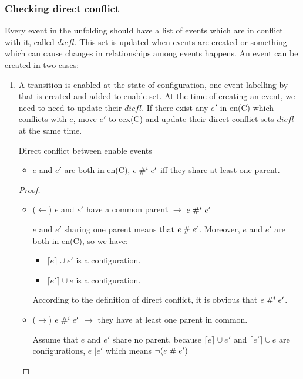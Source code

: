 \documentclass{llncs}
\begin{document}
\subsubsection{Checking direct conflict}
Every event in the unfolding should have a list of events which are in conflict with it, called $dicfl$. This set is updated when events are created or something which can cause changes in relationships among events happens.
An event can be created in two cases:
\begin{enumerate}
	\item
		A transition is enabled at the state of configuration, one event labelling by that is
		created and added to enable set. At the time of creating an event, we need to 
		need to update their $dicfl$. If there exist any $e'$ in en(C) which conflicts with $e$,
		move $e'$ to cex(C) and update their direct conflict sets $dicfl$ at the same time. 		
		
		\begin{lemma}{Direct conflict between enable events}
			\begin{itemize}
				\item
					$e$ and $e'$ are both in en(C), $e \mathrel{\#^i_{}} e'$ iff they share at least one parent.		
			\end{itemize}
		\label{thm:lem1}
		\end{lemma}
		
		\begin{proof}
		\begin{itemize}
			\item
			($\leftarrow$) $e$ and $e'$ have a common parent $\rightarrow$ $e \mathrel{\#^i_{}} e'$
			
			 $e$ and $e'$ sharing one parent means that  $e \mathrel{\#} e'$. Moreover, $e$ and $e'$ are both in
			  en(C), so we have:
			\begin{itemize}
				\item
					$\lceil e \rceil \cup e'$ is a configuration.
				\item
					$\lceil e' \rceil \cup e$ is a configuration.
			\end{itemize} 
			According to the definition of direct conflict, it is obvious that $e \mathrel{\#^i_{}} e'$.
			
			\item
			($\rightarrow$) $e \mathrel{\#^i_{}} e'$ $\rightarrow$ they have at least one parent in common.
			
			Assume that $e$ and $e'$ share no parent, because $\lceil e \rceil \cup e'$ and $\lceil
			e' \rceil \cup e$ are configurations, $e || e'$ which means $\lnot (e \mathrel{\#} e')$
		\end{itemize}			
		\end{proof}			
		

\end{enumerate}
\end{document}
